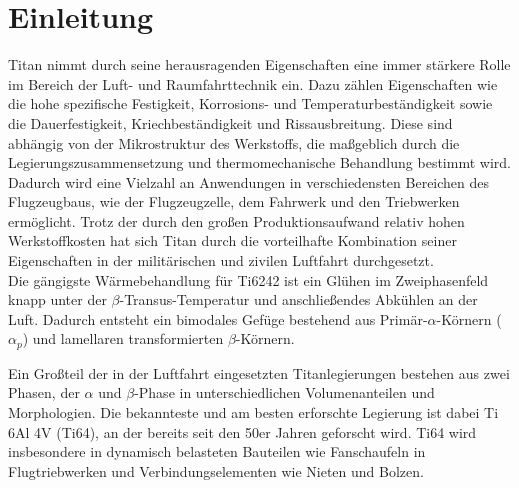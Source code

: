 \chapter{Einleitung} 
Titan nimmt durch seine herausragenden Eigenschaften eine immer stärkere Rolle im Bereich der Luft- und Raumfahrttechnik ein. Dazu zählen Eigenschaften wie die hohe spezifische Festigkeit, Korrosions- und Temperaturbeständigkeit sowie die Dauerfestigkeit, Kriechbeständigkeit und Rissausbreitung. Diese sind abhängig von der Mikrostruktur des Werkstoffs, die maßgeblich durch die Legierungszusammensetzung und thermomechanische Behandlung bestimmt wird. Dadurch wird eine Vielzahl an Anwendungen in verschiedensten Bereichen des Flugzeugbaus, wie der Flugzeugzelle, dem Fahrwerk und den Triebwerken ermöglicht. Trotz der durch den großen Produktionsaufwand relativ hohen Werkstoffkosten hat sich Titan durch die vorteilhafte Kombination seiner Eigenschaften in der militärischen und zivilen Luftfahrt durchgesetzt. \\ 

Die gängigste Wärmebehandlung für Ti6242 ist ein Glühen im Zweiphasenfeld knapp unter der $\beta$-Transus-Temperatur und anschließendes Abkühlen an der Luft. Dadurch entsteht ein bimodales Gefüge bestehend aus Primär-$\alpha$-Körnern ($\alpha_p$) und lamellaren transformierten $\beta$-Körnern. 

Ein Großteil der in der Luftfahrt eingesetzten Titanlegierungen bestehen aus zwei Phasen, der $\alpha$ und $\beta$-Phase in unterschiedlichen Volumenanteilen und Morphologien. Die bekannteste und am besten erforschte Legierung ist dabei Ti 6Al 4V (Ti64), an der bereits seit den 50er Jahren geforscht wird. Ti64 wird insbesondere in dynamisch belasteten Bauteilen wie Fanschaufeln in Flugtriebwerken und Verbindungselementen wie Nieten und Bolzen. 

